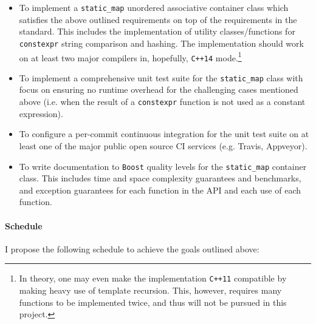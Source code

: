 \documentclass[a4paper,12pt]{article}
\begin{document}
\begin{itemize}
\begin{spacing}{0.8}
\begin{lstlisting}
// Challenging: should only generate code loading immediately from a memory location. 
// It must NOT generate any additional runtime overhead like hashing or searching.
char const* what_is_8 = cmap[8];

// Challenging: again, should only generate code loading from memory.
auto cmap2 = make_static_map(map_data);
auto& at_0 = map_data[0];
at_0 = "orange";
\end{lstlisting}
\end{spacing}
        If all inputs for a \texttt{constexpr} operation are constant expressions, but the result is not used as a constant expression, then the compiler in \textit{not required} to execute the operation at compile-time. This is what makes lines 19, 23 and 24 so challenging.
    \item To implement a \texttt{static\_map} unordered associative container class which satisfies the above outlined requirements on top of the requirements in the standard. This includes the implementation of utility classes/functions for \texttt{constexpr} string comparison and hashing. The implementation should work on at least two major compilers in, hopefully, \texttt{C++14} mode.\footnote{In theory, one may even make the implementation \texttt{C++11} compatible by making heavy use of template recursion. This, however, requires many functions to be implemented twice, and thus will not be pursued in this project.}
    \item To implement a comprehensive unit test suite for the \texttt{static\_map} class with focus on ensuring no runtime overhead for the challenging cases mentioned above (i.e. when the result of a \texttt{constexpr} function is not used as a constant expression).
    \item To configure a per-commit continuous integration for the unit test suite on at least one of the major public open source CI services (e.g. Travis, Appveyor).
    \item To write documentation to \texttt{Boost} quality levels for the \texttt{static\_map} container class. This includes time and space complexity guarantees and benchmarks, and exception guarantees for each function in the API and each use of each function. 
    \end{itemize}

    \paragraph{Schedule} I propose the following schedule to achieve the goals outlined above:
\end{document}
